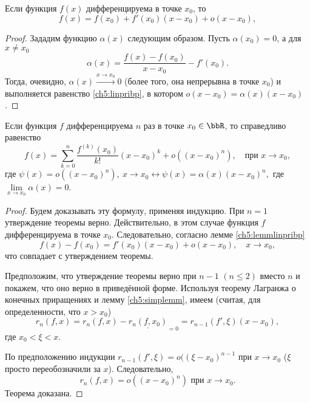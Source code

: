 \begin{lemm}\label{ch5:lemmlinpribp}
Если функция $f(x)$ дифференцируема в точке $x_0$, то
\begin{equation}\label{ch5:linpribp}
f(x) = f(x_0) + f'(x_0) (x-x_0) + o(x-x_0),
\end{equation}
\end{lemm}
\begin{proof}
Зададим функцию $\alpha(x)$ следующим образом. Пусть $\alpha(x_0) = 0$, а для $x\ne x_0$ 
$$
\alpha(x) = \frac{f(x) - f(x_0)}{x-x_0} - f'(x_0). 
$$
Тогда, очевидно, $\alpha(x)\xrightarrow{x\to x_0} 0$ (более того, она непрерывна в точке $x_0$) и выполняется равенство \eqref{ch5:linpribp}, в котором $o(x-x_0) = \alpha(x)(x-x_0)$.
\end{proof}
\begin{thm}
Если функция $f$ дифференцируема $n$ раз в точке $x_0 \in \bbR$, то справедливо равенство
\begin{equation} \label{ch5.2eq2}
f(x) = \sum_{k = 0}^{n} \frac{f^{(k)}(x_0)}{k!} (x - x_0)^k + o((x - x_0)^n), \quad \text{при } x \to x_0,
\end{equation}
где $\psi(x) = o((x - x_0)^n),\ x \to x_0 \leftrightarrow \psi(x) = \alpha(x) (x - x_0)^n,$ где $\lim\limits_{x \to x_0} \alpha(x) = 0$.
\end{thm}
\begin{proof}
Будем доказывать эту формулу, применяя индукцию. При $n=1$ утверждение теоремы верно. Действительно, в этом случае функция $f$ дифференцируема в точке $x_0$. Следовательно, согласно лемме \ref{ch5:lemmlinpribp}
$$
f(x) - f(x_0) = f'(x_0) (x-x_0) + o(x-x_0),\quad x\to x_0,
$$
что совпадает с утверждением теоремы.

Предположим, что утверждение теоремы верно при $n-1$ $(n\le 2)$ вместо $n$ и покажем, что оно верно в приведённой форме. Используя теорему Лагранжа о конечных приращениях и лемму \ref{ch5:simplemm}, имеем (считая, для определенности, что $x > x_0$)
$$
r_n(f,x) = r_n(f,x) - \underline{r_n(f,x_0)}_{=0} = r_{n-1} (f',\xi) (x-x_0),
$$
где $x_0<\xi<x$.

По предположению индукции $r_{n-1}(f', \xi) = o((\xi-x_0)^{n-1}$ при $x\to x_0$ ($\xi$ просто переобозначили за $x$). Следовательно, 
$$
r_n(f,x) = o((x-x_0)^n) \text{ при } x\to x_0.
$$
Теорема доказана.
\end{proof}
